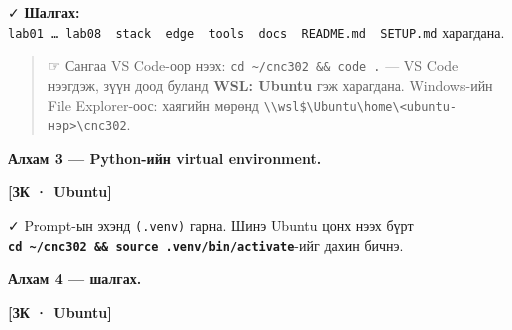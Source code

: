\begin{Shaded}
\begin{Highlighting}[]
\NormalTok{ \textasciitilde{}}
\OperatorTok{\textless{}}\OperatorTok{\textgreater{}}
\end{Highlighting}
\end{Shaded}

✓ \textbf{Шалгах:} \texttt{lab01\ \ldots{}\ lab08\ \ stack\ \ edge\ \ tools\ \ docs\ \ README.\allowbreak{}md\ \ SETUP.\allowbreak{}md} харагдана.

\begin{quote}
☞ Сангаа VS Code-оор нээх: \texttt{cd\ \textasciitilde{}/cnc302\ \&\&\ code\ .} --- VS Code нээгдэж, зүүн доод буланд \textbf{WSL: Ubuntu} гэж харагдана. Windows-ийн File Explorer-оос: хаягийн мөрөнд \texttt{\textbackslash{}\allowbreak{}\textbackslash{}\allowbreak{}wsl\$\textbackslash{}\allowbreak{}Ubuntu\textbackslash{}\allowbreak{}home\textbackslash{}\allowbreak{}\textless{}ubuntu-нэр\textgreater{}\textbackslash{}\allowbreak{}cnc302}.
\end{quote}

\textbf{Алхам 3 --- Python-ийн virtual environment.}

\textbf{{[}ЗК · Ubuntu{]}}

\begin{Shaded}
\begin{Highlighting}[]
\end{Highlighting}
\end{Shaded}

✓ Prompt-ын эхэнд \texttt{(.venv)} гарна. Шинэ Ubuntu цонх нээх бүрт \textbf{\texttt{cd\ \textasciitilde{}/cnc302\ \&\&\ source\ .venv/bin/activate}}-ийг дахин бичнэ.

\textbf{Алхам 4 --- шалгах.}

\textbf{{[}ЗК · Ubuntu{]}}

\begin{Shaded}
\begin{Highlighting}[]
\end{Highlighting}
\end{Shaded}


